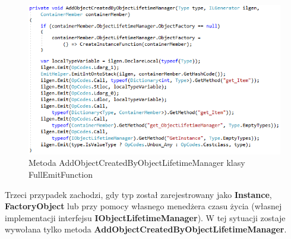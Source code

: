 \documentclass[12pt]{article}
\begin{document}
\begin{figure}[h]
	\begin{center}
  		\includegraphics{FullEmitFunction_AddObjectCreatedByObjectLifetimeManager.png}
  		\caption{Metoda AddObjectCreatedByObjectLifetimeManager klasy FullEmitFunction}
  		\label{fig:FullEmitFunction_AddObjectCreatedByObjectLifetimeManager}
	\end{center}
\end{figure}

Trzeci przypadek zachodzi, gdy typ został zarejestrowany jako \textbf{Instance}, \textbf{FactoryObject} lub przy pomocy własnego menedżera czasu życia (własnej implementacji interfejsu \textbf{IObjectLifetimeManager}). W tej sytuacji zostaje wywołana tylko metoda \textbf{AddObjectCreatedByObjectLifetimeManager}.
\end{document}
